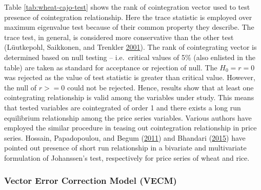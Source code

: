 \documentclass[12pt,]{article}
\begin{document}
Table \ref{tab:wheat-cajo-test} shows the rank of cointegration vector used to test presence of cointegration relationship. Here the trace statistic is employed over maximum eigenvalue test because of their common property they describe. The trace test, in general, is considered more conservative than the other test (Lüutkepohl, Saikkonen, and Trenkler \protect\hyperlink{ref-luutkepohl2001maximum}{2001}). The rank of cointegrating vector is determined based on null testing -- i.e.~critical values of 5\% (also enlisted in the table) are taken as standard for acceptance or rejection of null. The \(H_0 = r = 0\) was rejected as the value of test statistic is greater than critical value. However, the null of \(r >= 0\) could not be rejected. Hence, results show that at least one cointegrating relationship is valid among the variables under study. This means that tested variables are cointegrated of order 1 and there exists a long run equilibrium relationship among the price series variables. Various authors have employed the similar procedure in teasing out cointegration relationship in price series. Hossain, Papadopoulou, and Begum (\protect\hyperlink{ref-hossain2011cointegration}{2011}) and Bhandari (\protect\hyperlink{ref-bhandari2015cointegration}{2015}) have pointed out presence of short run relationship in a bivariate and multivariate formulation of Johanssen's test, respectively for price series of wheat and rice.

\hypertarget{vector-error-correction-model-vecm}{%
\subsubsection{Vector Error Correction Model (VECM)}\label{vector-error-correction-model-vecm}}

\begingroup\fontsize{10}{12}\selectfont
\end{document}
